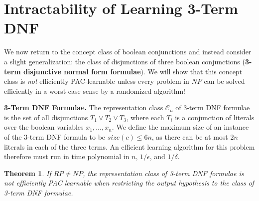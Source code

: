 \documentclass{article}
\newtheorem{thm}{Theorem}
\begin{document}
\section{Intractability of Learning 3-Term DNF}

We now return to the concept class of boolean conjunctions and instead consider
a slight generalization: the class of disjunctions of three boolean conjunctions
(\textbf{3-term disjunctive normal form formulae}). We will show that this concept
class is \emph{not} efficiently PAC-learnable unless every problem in $NP$ can be
solved efficiently in a worst-case sense by a randomized algorithm!

\textbf{3-Term DNF Formulae.} The representation class $\mathcal{C}_n$ of 3-term
DNF formulae is the set of all disjunctions $T_1 \vee T_2 \vee T_3$, where each
$T_i$ is a conjunction of literals over the boolean variables $x_1, \dots, x_n$.
We define the maximum size of an instance of the 3-term DNF formula to be
$size(c) \leq 6n$, as there can be at most $2n$ literals in each of the three
terms. An efficient learning algorithm for this problem therefore must run in
time polynomial in $n$, $1/\epsilon$, and $1/\delta$.\\

\begin{framed}
\begin{thm}
    If $RP \neq NP$, the representation class of 3-term DNF formulae is not
    efficiently PAC learnable when restricting the output hypothesis to the
    class of 3-term DNF formulae.
\end{thm}
\end{framed}
\end{document}
